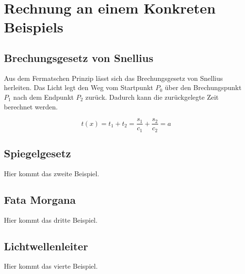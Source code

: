 \section{Rechnung an einem Konkreten Beispiels}

\subsection{Brechungsgesetz von Snellius}
Aus dem Fermatschen Prinzip lässt sich das Brechungsgesetz von Snellius herleiten.
Das Licht legt den Weg vom Startpunkt $P_0$ über den Brechungspunkt $P_1$ 
nach dem Endpunkt $P_2$ zurück. Dadurch kann die zurückgelegte Zeit berechnet werden.

\[
t(x) =
t_1 + t_2 =
\frac{s_1}{c_1} + \frac{s_2}{c_2} =
a
\]


\subsection{Spiegelgesetz}
Hier kommt das zweite Beispiel.

\subsection{Fata Morgana}
Hier kommt das dritte Beispiel.

\subsection{Lichtwellenleiter}
Hier kommt das vierte Beispiel.